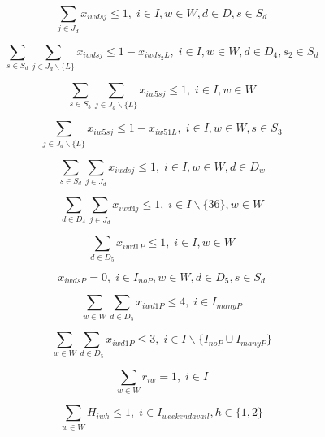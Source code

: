 \begin{equation}
\sum_{j \in J_d} x_{iwdsj} \leq 1, \;   i \in I, w \in W, d \in D, s \in S_d
\end{equation}

\begin{equation}
\sum_{s \in S_d}\sum_{j \in J_d\backslash \{L\}} x_{iwdsj} \leq 1 - x_{iwds_2L}, \;   i \in I, w \in W, d \in D_4, s_2 \in S_d
\end{equation}

\begin{equation}
\sum_{s \in S_5}\sum_{j \in J_d\backslash \{L\}} x_{iw5sj} \leq 1, \;   i \in I, w \in W
\end{equation}

\begin{equation}
\sum_{j \in J_d\backslash \{L\}} x_{iw5sj} \leq 1 - x_{iw51L}, \;   i \in I, w \in W, s \in S_3
\end{equation}

\begin{equation}
\sum_{s \in S_d}\sum_{j \in J_d} x_{iwdsj} \leq 1, \;   i \in I, w \in W, d \in D_w
\end{equation}

\begin{equation}
\sum_{d \in D_4}\sum_{j \in J_d} x_{iwd4j} \leq 1, \;   i \in I \backslash \{36\}, w \in W
\end{equation}

\begin{equation}
\sum_{d \in D_5} x_{iwd1P} \leq 1, \; i \in I, w \in W
\end{equation}

\begin{equation}
x_{iwdsP} = 0, \; i \in I_{noP}, w \in W, d \in D_5, s \in S_d
\end{equation}

\begin{equation}
\sum_{w \in W} \sum_{d \in D_5} x_{iwd1P} \leq 4, \; i \in I_{manyP}
\end{equation}

\begin{equation}
\sum_{w \in W} \sum_{d \in D_5} x_{iwd1P} \leq 3, \; i \in I \backslash\{I_{noP} \cup I_{manyP}\}
\end{equation}	

\begin{equation}
\sum_{w \in W} r_{iw} = 1, \; i \in I
\end{equation}

\begin{equation}
\sum_{w \in W} H_{iwh} \leq 1, \; i \in I_{weekendavail}, h \in \{1,2\}
\end{equation}

